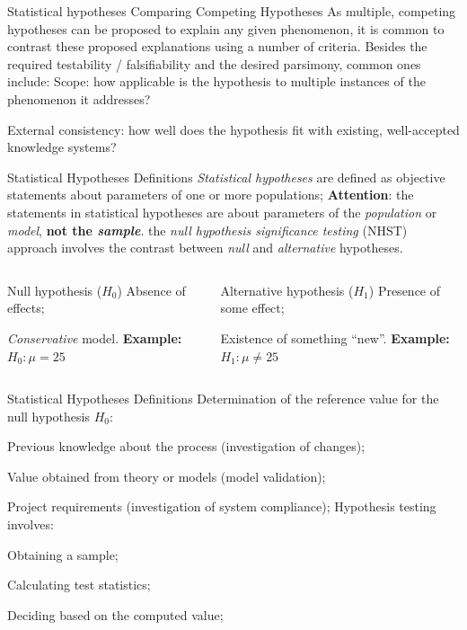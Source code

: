 \documentclass[t]{beamer}
\begin{document}

\begin{ftst}
	{Statistical hypotheses}
	{Comparing Competing Hypotheses}
	As multiple, competing hypotheses can be proposed to explain any given phenomenon, it is common to contrast these proposed explanations using a number of criteria. 
	\vone
	Besides the required testability / falsifiability and the desired parsimony, common ones include:
	\vone
	\bitems Scope: how applicable is the hypothesis to multiple instances of the phenomenon it addresses?
	\item External consistency: how well does the hypothesis fit with existing, well-accepted knowledge systems?
	\eitem
\end{ftst}


\begin{ftst}
{Statistical Hypotheses}
{Definitions}
\textit{Statistical hypotheses} are defined as objective statements about parameters of one or more populations;
\vone
\textbf{Attention}: the statements in statistical hypotheses are about parameters of the \textit{population} or \textit{model}, \textbf{not the \textit{sample}}.
\vone
the \textit{null hypothesis significance testing} (NHST) approach involves the contrast between \textit{null} and \textit{alternative} hypotheses.
\begin{columns}[T]
	\begin{block}{Null hypothesis ($H_0$)}
	\small
	\bitems Absence of effects;
	\item \textit{Conservative} model.\eitem
	\textbf{Example:} $H_0: \mu = 25$
	\end{block}
	\begin{block}{Alternative hypothesis ($H_1$)}
	\small 
	\bitems Presence of some effect;
	\item Existence of something ``new''.\eitem
	\textbf{Example:} $H_1: \mu \neq 25$
		\end{block}
	\end{columns}
\end{ftst}


\begin{ftst}
{Statistical Hypotheses}
{Definitions}
Determination of the reference value for the null hypothesis $H_0$:

\bitems Previous knowledge about the process (investigation of changes);
	\item Value obtained from theory or models (model validation);
	\item Project requirements (investigation of system compliance);
\eitem
\vone
Hypothesis testing involves:

\bitems Obtaining a sample;
	\item Calculating test statistics;
	\item Deciding based on the computed value;
\eitem
\end{ftst}
\end{document}
